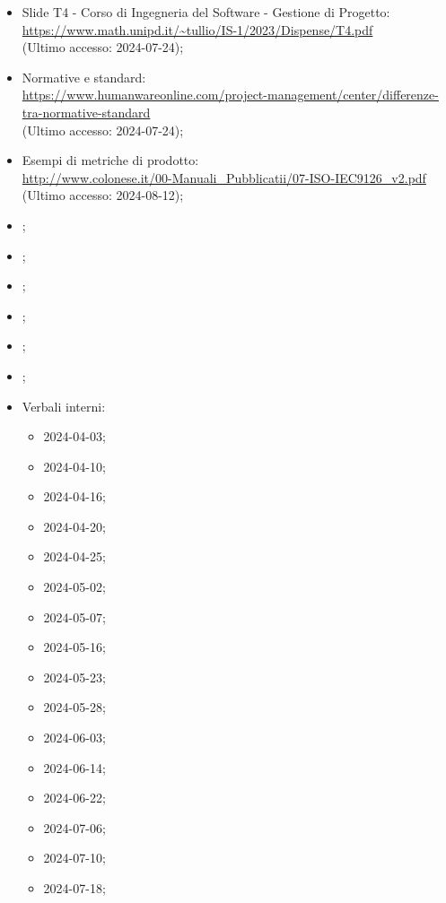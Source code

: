 \begin{itemize}
  \item Slide T4 - Corso di Ingegneria del Software - Gestione di Progetto: \\ \href{https://www.math.unipd.it/~tullio/IS-1/2023/Dispense/T4.pdf}{https://www.math.unipd.it/\textasciitilde tullio/IS-1/2023/Dispense/T4.pdf}  \\ (Ultimo accesso: 2024-07-24);
  \item Normative e standard: \\ \href{https://www.humanwareonline.com/project-management/center/differenze-tra-normative-standard}{https://www.humanwareonline.com/project-management/center/differenze-tra-normative-standard}  \\ (Ultimo accesso: 2024-07-24);
  \item Esempi di metriche di prodotto: \\ \href{http://www.colonese.it/00-Manuali_Pubblicatii/07-ISO-IEC9126_v2.pdf}{http://www.colonese.it/00-Manuali\_Pubblicatii/07-ISO-IEC9126\_v2.pdf} \\ (Ultimo accesso: 2024-08-12);
  \item \PianoDiProgetto;
  \item \PianoDiQualifica;
  \item \AnalisiDeiRequisiti;
  \item \Glossario;
  \item \SpecificaTecnica;
  \item \ManualeUtente;
  \item Verbali interni:
  \begin{itemize}
    \item 2024-04-03;
    \item 2024-04-10;
    \item 2024-04-16;
    \item 2024-04-20;
    \item 2024-04-25;
    \item 2024-05-02;
    \item 2024-05-07;
    \item 2024-05-16;
    \item 2024-05-23;
    \item 2024-05-28;
    \item 2024-06-03;
    \item 2024-06-14;
    \item 2024-06-22;
    \item 2024-07-06;
    \item 2024-07-10;
    \item 2024-07-18;

\end{itemize}
\end{itemize}
